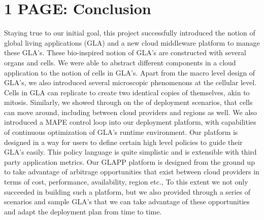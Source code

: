 \documentclass{seal_thesis}
\begin{document}
\chapter{1 PAGE: Conclusion}\label{ch:conclusion}


Staying true to our initial goal, this project successfully introduced the notion of global living applications (GLA) and a new cloud middleware platform to manage these GLA's. These bio-inspired notion of GLA's are constructed with several organs and cells. 
We were able to abstract different components in a cloud application to the notion of cells in GLA's. Apart from the macro level design of GLA's, we also introduced several microscopic phenomenons at the cellular level. 
Cells in GLA can replicate to create two identical copies of themselves, akin to mitosis. Similarly, we showed through on the of deployment scenarios, that cells can move around, including between cloud providers  and regions as well. 
We also introduced a MAPE control loop into our deployment platform, with capabilities of continuous optimization of GLA's runtime environment. 
Our platform is designed in a way for users to define certain high level policies to guide their GLA's easily. 
This policy language is quite simplistic and is extensible with third party application metrics. Our GLAPP platform is designed from the ground up to take advantage of arbitrage opportunities that exist between cloud providers in terms of cost, performance, availability, region etc., 
To this extent we not only succeeded in building such a platform, but we also provided through a series of scenarios and sample GLA's that we can take advantage of these opportunities and adapt the deployment plan from time to time.
\end{document}
